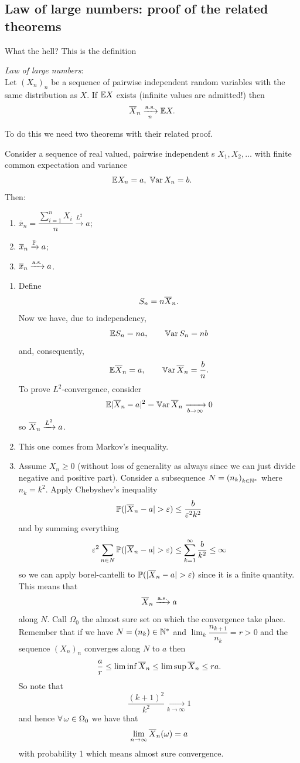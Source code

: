 \documentclass{report}
\begin{document}
\subsection{Law of large numbers: proof of the related theorems}
What the hell? This is the definition
\begin{theorem}
	\emph{Law of large numbers}:\\
	Let ${(X_n)}_{n}$ be a sequence of pairwise independent random variables with the same distribution as $X$. If $\mathbb{E} X$ exists (infinite values are admitted!) then
	\[\overline{X}_n\xrightarrow[n]{\mathrm{a.s.}}\mathbb{E} X.\]
\end{theorem}
To do this we need two theorems with their related proof.
\begin{theorem}
	Consider a sequence of real valued, pairwise independent \rv s $X_1,X_2,\ldots$ with finite common expectation and variance
	\[\mathbb{E} X_n=a,\;\mathbb{V}\mathrm{ar}\, X_n=b.\]
	Then:
	\begin{enumerate}[\circnum]
		\item $\overline{x}_{n}=\dfrac{\sum_{i=1}^{n}X_i}{n}\xrightarrow[]{L^{2}}a$;
		\item $\overline{x}_{n}\xrightarrow[]{\mathbb{P}} a$;
		\item $\overline{x}_{n}\xrightarrow[]{\text{a.s.}} a$.
	\end{enumerate}
\end{theorem}
\begin{fancyproof}
\begin{enumerate}
	\item Define 
	\[S_{n}=n\overline{X}_{n}.\]
	Now we have, due to independency,
	\[\mathbb{E} S_{n}=na,\qquad\mathbb{V}\mathrm{ar}\, S_{n}=nb\]
	and, consequently,
	\[\mathbb{E}\overline{X}_{n}=a,\qquad\mathbb{V}\mathrm{ar}\,\overline{X}_{n}=\frac{b}{n}.\]
	To prove $L^{2}$-convergence, consider
	\[\mathbb{E}|\overline{X}_{n}-a|^{2}=\mathbb{V}\mathrm{ar}\, \overline{X}_{n}\xrightarrow[b\to\infty]{}0\]
	so $\overline{X}_{n}\xrightarrow[]{L^{2}}a$.
	\item This one comes from Markov's inequality.
	\item Assume $X_{n}\geq0$ (without loss of generality as always since we can just divide negative and positive part). Consider a subsequence $N={(n_{k})}_{k\in\mathbb{N}^{*}}$ where $n_{k}=k^{2}$. Apply Chebyshev's inequality 
	\[\pr(|\xbar_{n}-a|>\varepsilon)\leq\frac{b}{\varepsilon^{2}k^{2}}\]
	and by summing everything
	\[\varepsilon^{2}\sum_{n\in N}\pr(|\xbar_{n}-a|>\varepsilon)\leq\sum_{k=1}^{\infty}\frac{b}{k^{2}}\leq\infty\]
	so we can apply borel-cantelli to $\pr(|\xbar_{n}-a|>\varepsilon)$ since it is a finite quantity. This means that 
	\[\overline{X}_{n}\xrightarrow[]{\text{a.s.}} a\]
	along $N$. Call $\Omega_0$ the almost sure set on which the convergence take place. Remember that if we have $N={(n_{k})}\in\mathbb{N}^{*}$ and $\lim_{k}\dfrac{n_{k+1}}{n_{k}}=r>0$ and the sequence ${(X_{n})}_{n}$ converges along $N$ to $a$ then
	\[\frac{a}{r}\leq\liminf \overline{X}_{n}\leq\limsup\overline{X}_{n}\leq ra.\]
	So note that
	\[\frac{(k+1)^{2}}{k^{2}}\xrightarrow[k\to\infty]{}1\]
	and hence $\forall\, \omega\in\Omega_0$ we have that
	\[\lim_{n\to\infty}\overline{X}_{n}(\omega)=a\]
	with probability 1 which means almost sure convergence.
\end{enumerate}
\end{fancyproof}
\end{document}
